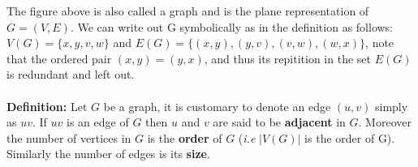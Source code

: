 \documentclass[11pt]{amsart}
\begin{document}
\noindent The figure above is also called a graph and is the plane representation of $G =(V,E)$. We can write out G symbolically as in the definition as follows:\\
$V(G) = \{x,y,v,w\}$ and $E(G) = \{(x,y),(y,v), (v,w),(w,x)\}$, note that the ordered pair $(x,y) = (y,x)$, and thus its repitition in the set $E(G)$ is redundant and left out.\\\\
\textbf{Definition:} Let $G$ be a graph, it is customary to denote an edge $(u,v)$ simply as $uv$. If $uv$ is an edge of $G$ then $u$ and $v$ are said to be \textbf{adjacent} in $G$. Moreover the number of vertices in $G$ is the \textbf{order} of $G$ (\textit{i.e} $|V(G)|$ is the order of G). Similarly the number of edges is its \textbf{size}.
\end{document}
